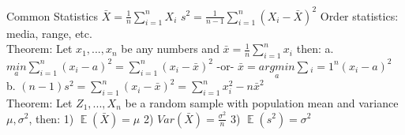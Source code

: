 \documentclass[twocolumn]{article}
\DeclareMathOperator{\EX}{\mathbb{E}} %
\let\Oldsum=\sum
\renewcommand{\sum}{\Oldsum\limits}
\begin{document}
Common Statistics
$\bar{X} = \frac{1}{n} \sum_{i=1}^{n} X_i$
$s^2 = \frac{1}{n-1}\sum_{i=1}^{n}(X_i - \bar{X})^2$
Order statistics: media, range, etc. \\

Theorem: Let $x_1, ..., x_n$ be any numbers and $\bar{x} = \frac{1}{n}\sum_{i=1}^{n} x_i$ then:
a. $\underset{a}{min}\sum_{i=1}^{n} (x_i -a)^2 = \sum_{i=1}^{n} (x_i - \bar{x})^2$ -or- $\bar{x} = \underset{a}{argmin}\sum{_i=1}^{n} (x_i - a)^2$
b. $(n-1)s^2 = \sum_{i=1}^{n} (x_i - \bar{x})^2 = \sum_{i=1}^{n}x_i^2 - n\bar{x}^2$\\

Theorem: Let $Z_1, ..., X_n$ be a random sample with population mean and variance $\mu, \sigma^2$, then:
1) $\EX(\bar{X}) = \mu$
2) $Var(\bar{X}) = \frac{\sigma^2}{n}$
3) $\EX(s^2) = \sigma^2$
\end{document}
